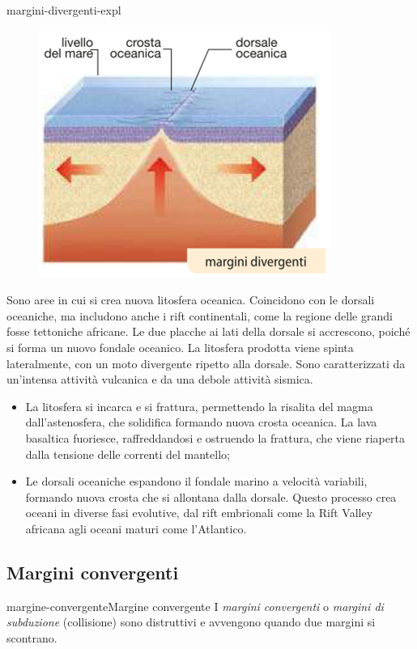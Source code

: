 \documentclass[preview]{standalone}
\begin{document}
\begin{snippet}{margini-divergenti-expl}
    \setlength{\intextsep}{0pt}%
    \begin{figure}
        \includegraphics[width=.4\textwidth]{resources/margini-divergenti.png}
    \end{figure}

    Sono aree in cui si crea nuova litosfera oceanica. Coincidono con le dorsali oceaniche,
    ma includono anche i rift continentali, come la regione delle grandi fosse tettoniche
    africane. Le due placche ai lati della dorsale si accrescono, poiché si forma un nuovo
    fondale oceanico. La litosfera prodotta viene spinta lateralmente, con un moto
    divergente ripetto alla dorsale. Sono caratterizzati da un'intensa
    attività vulcanica e da una debole attività sismica.
    \wrapfill
    \vspace{-1cm}
    \begin{itemize}
        \item La litosfera si incarca e si frattura, permettendo la risalita del magma
            dall'astenosfera, che solidifica formando nuova crosta oceanica. La lava basaltica
            fuoriesce, raffreddandosi e ostruendo la frattura, che viene riaperta dalla tensione
            delle correnti del mantello;
        \item Le dorsali oceaniche espandono il fondale marino a velocità variabili, formando
            nuova crosta che si allontana dalla dorsale. Questo processo crea oceani in diverse
            fasi evolutive, dal rift embrionali come la Rift Valley africana agli oceani maturi
            come l'Atlantico.
    \end{itemize}
\end{snippet}

\subsection{Margini convergenti}

\begin{snippetdefinition}{margine-convergente}{Margine convergente}
    I \textit{margini convergenti} o \textit{margini di subduzione} (collisione) sono distruttivi e
    avvengono quando due margini si scontrano.
\end{snippetdefinition}
\end{document}
